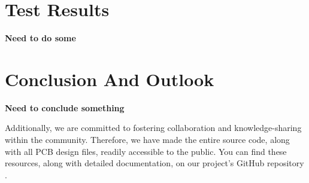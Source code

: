 \documentclass[10pt,a4paper,twocolumn]{article}
\begin{document}
\section{Test Results}\label{section:tests}
\textbf{Need to do some}

\section{Conclusion And Outlook}\label{section:conclusion}
\textbf{Need to conclude something}

Additionally, we are committed to fostering collaboration and knowledge-sharing
within the community.
Therefore, we have made the entire source code, along with all PCB design files,
readily accessible to the public.
You can find these resources, along with detailed documentation,
on our project's GitHub repository \cite{uwb-tracking}.




\end{document}
